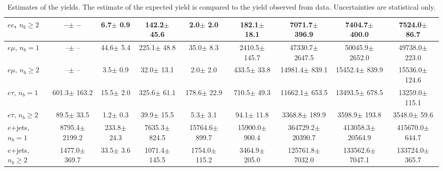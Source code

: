 \begin{sidewaystable}[p]
\begin{tabular}{l|cccccc|cc}
    $e e$, $n_b\geq2$                  &       --$\pm$     -- &      6.7$\pm$    0.9 &    142.2$\pm$   45.6 &      2.0$\pm$    2.0 &    182.1$\pm$   18.1 &   7071.7$\pm$  396.9 &   7404.7$\pm$  400.0 &   7524.0$\pm$   86.7 \\ 
    \hline
    $e\mu$, $n_b=1$                    &       --$\pm$     -- &     44.6$\pm$    5.4 &    225.1$\pm$   48.8 &     35.0$\pm$    8.3 &   2410.5$\pm$  145.7 &  47330.7$\pm$ 2647.5 &  50045.9$\pm$ 2652.0 &  49738.0$\pm$  223.0 \\ 
    $e\mu$, $n_b\geq2$                 &       --$\pm$     -- &      3.5$\pm$    0.9 &     32.0$\pm$   13.1 &      2.0$\pm$    2.0 &    433.5$\pm$   33.8 &  14981.4$\pm$  839.1 &  15452.4$\pm$  839.9 &  15536.0$\pm$  124.6 \\ 
    \hline
    $e\tau$, $n_b=1$                   &    601.3$\pm$  163.2 &     15.5$\pm$    2.0 &    325.6$\pm$   61.1 &    178.6$\pm$   22.9 &    710.5$\pm$   49.3 &  11662.1$\pm$  653.5 &  13493.5$\pm$  678.5 &  13259.0$\pm$  115.1 \\ 
    $e\tau$, $n_b\geq2$                &     89.5$\pm$   33.5 &      1.2$\pm$    0.3 &     39.9$\pm$   15.5 &      5.3$\pm$    3.1 &     94.1$\pm$   11.8 &   3368.8$\pm$  189.9 &   3598.9$\pm$  193.8 &   3548.0$\pm$   59.6 \\ 
    \hline
    $e$+jets, $n_b=1$                  &   8795.4$\pm$ 2199.2 &    233.8$\pm$   24.3 &   7635.3$\pm$  824.5 &  15764.6$\pm$  899.7 &  15900.0$\pm$  900.4 & 364729.2$\pm$20390.7 & 413058.3$\pm$20564.9 & 415670.0$\pm$  644.7 \\ 
    $e$+jets, $n_b\geq2$               &   1477.0$\pm$  369.7 &     33.5$\pm$    3.6 &   1071.4$\pm$  145.5 &   1754.0$\pm$  115.2 &   3464.9$\pm$  205.0 & 125761.8$\pm$ 7032.0 & 133562.6$\pm$ 7047.1 & 133724.0$\pm$  365.7 \\ 
    \hline

    \end{tabular}
    \caption{Estimates of the yields. The estimate of the expected yield is compared to
    the yield observed from data.  Uncertainties are statistical only.
    \label{tab:yields}}
\end{sidewaystable}

